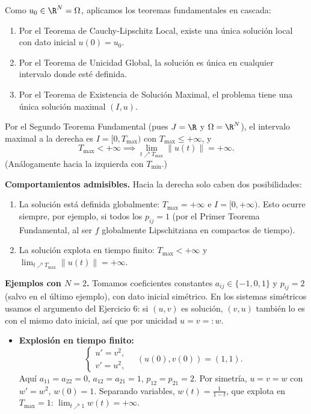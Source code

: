 {    Como $u_0 \in \R^N = \Omega$, aplicamos los teoremas fundamentales en cascada:
    \begin{enumerate}[label=\Roman*)]
        \item Por el Teorema de Cauchy-Lipschitz Local, existe una única solución local con dato inicial $u(0) = u_0$.
        \item Por el Teorema de Unicidad Global, la solución es única en cualquier intervalo donde esté definida.
        \item Por el Teorema de Existencia de Solución Maximal, el problema tiene una única solución maximal $(I, u)$.
    \end{enumerate}
    Por el Segundo Teorema Fundamental (pues $J = \R$ y $\Omega = \R^N$), el intervalo maximal a la derecha es $I = [0, T_{\max})$ con $T_{\max} \le +\infty$, y
    \[
        T_{\max} < +\infty \implies \lim_{t \nearrow T_{\max}} \|u(t)\| = +\infty.
    \]
    (Análogamente hacia la izquierda con $T_{\min}$.)

    \textbf{Comportamientos admisibles.} Hacia la derecha solo caben dos posibilidades:
    \begin{enumerate}
        \item La solución está definida globalmente: $T_{\max} = +\infty$ e $I = [0, +\infty)$. Esto ocurre siempre, por ejemplo, si todos los $p_{ij} = 1$ (por el Primer Teorema Fundamental, al ser $f$ globalmente Lipschitziana en compactos de tiempo).
        \item La solución explota en tiempo finito: $T_{\max} < +\infty$ y $\lim_{t \nearrow T_{\max}} \|u(t)\| = +\infty$.
    \end{enumerate}

    \textbf{Ejemplos con $N = 2$.} Tomamos coeficientes constantes $a_{ij} \in \{-1, 0, 1\}$ y $p_{ij} = 2$ (salvo en el último ejemplo), con dato inicial simétrico. En los sistemas simétricos usamos el argumento del Ejercicio 6: si $(u,v)$ es solución, $(v,u)$ también lo es con el mismo dato inicial, así que por unicidad $u = v =: w$.
    \begin{itemize}
        \item \textbf{Explosión en tiempo finito:}
        \[
            \begin{cases}
                u' = v^2, \\
                v' = u^2,
            \end{cases}
            \quad (u(0), v(0)) = (1,1).
        \]
        Aquí $a_{11} = a_{22} = 0$, $a_{12} = a_{21} = 1$, $p_{12} = p_{21} = 2$. Por simetría, $u = v = w$ con $w' = w^2$, $w(0) = 1$. Separando variables, $w(t) = \frac{1}{1-t}$, que explota en $T_{\max} = 1$: $\lim_{t \nearrow 1} w(t) = +\infty$.


\end{itemize}}
